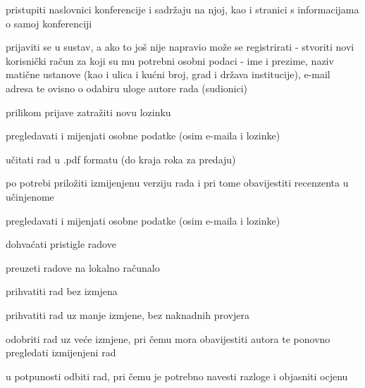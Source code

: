 			
			\begin{packed_enum}
				\item  {}
				
				\begin{packed_enum}
					
					\item pristupiti naslovnici konferencije i sadržaju na njoj, kao i stranici s informacijama o samoj konferenciji
					\item prijaviti se u sustav, a ako to još nije napravio može se registrirati - stvoriti novi korisnički račun za koji su mu potrebni osobni podaci - ime i prezime, naziv matične ustanove (kao i ulica i kućni broj, grad i država institucije), e-mail adresa te ovisno o odabiru uloge autore rada (sudionici)
					\item prilikom prijave zatražiti novu lozinku
					
				\end{packed_enum}
			
				\item  {}
				
				\begin{packed_enum}
					
					\item pregledavati i mijenjati osobne podatke (osim e-maila i lozinke)
					\item učitati rad u .pdf formatu (do kraja roka za predaju)
					\item po potrebi priložiti izmijenjenu verziju rada i pri tome obavijestiti recenzenta u učinjenome
					
					
				\end{packed_enum}
				
				\item  {}
				
				\begin{packed_enum}
					
					\item pregledavati i mijenjati osobne podatke (osim e-maila i lozinke)
					\item dohvaćati pristigle radove
					\item preuzeti radove na lokalno računalo
					\item prihvatiti rad bez izmjena
					\item prihvatiti rad uz manje izmjene, bez naknadnih provjera
					\item odobriti rad uz veće izmjene, pri čemu mora obavijestiti autora te ponovno pregledati izmijenjeni rad
					\item u potpunosti odbiti rad, pri čemu je potrebno navesti razloge i objasniti ocjenu
					

\end{packed_enum}
\end{packed_enum}
